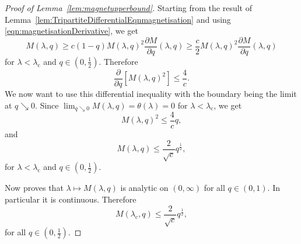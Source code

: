 \documentclass[10pt,a4paper,dvipsnames]{article}
\theoremstyle{definition}
\theoremstyle{remark}
\numberwithin{equation}{section}
\begin{document}
\begin{proof}[Proof of Lemma~\ref{lem:magnetupperbound}]
    Starting from the result of Lemma~\ref{lem:TripartiteDifferentialEqnmagnetisation} and using \eqref{eqn:magnetisationDerivative}, we get
    \begin{equation}
        M\left(\lambda,q\right) \geq c\left(1-q\right)M\left(\lambda,q\right)^2 \frac{\partial M}{\partial q}\left(\lambda,q\right) \geq \frac{c}{2}M\left(\lambda,q\right)^2 \frac{\partial M}{\partial q}\left(\lambda,q\right)
    \end{equation}
    for $\lambda<\lambda_\mathrm{c}$ and $q\in\left(0,\frac{1}{2}\right)$. Therefore 
    \begin{equation}
        \frac{\partial }{\partial q}\left[M\left(\lambda,q\right)^2\right] \leq \frac{4}{c}.
    \end{equation}
    We now want to use this differential inequality with the boundary being the limit at $q\searrow0$. Since $\lim_{q\searrow 0}M\left(\lambda,q\right) = \theta\left(\lambda\right) = 0$ for $\lambda<\lambda_\mathrm{c}$, we get
    \begin{equation}
        M\left(\lambda,q\right)^2 \leq \frac{4}{c}q,
    \end{equation}
    and
    \begin{equation}
        M\left(\lambda,q\right) \leq \frac{2}{\sqrt{c}}q^\frac{1}{2},
    \end{equation}
    for $\lambda < \lambda_\mathrm{c}$ and $q\in\left(0,\frac{1}{2}\right)$.

    Now \cite[Lemma~3.4]{caicedo2023critical} proves that $\lambda\mapsto M\left(\lambda,q\right)$ is analytic on $\left(0,\infty\right)$ for all $q\in\left(0,1\right)$. In particular it is continuous. Therefore
    \begin{equation}
        M\left(\lambda_\mathrm{c},q\right) \leq \frac{2}{\sqrt{c}}q^\frac{1}{2},
    \end{equation}
    for all $q\in\left(0,\frac{1}{2}\right)$.
\end{proof}
\end{document}
